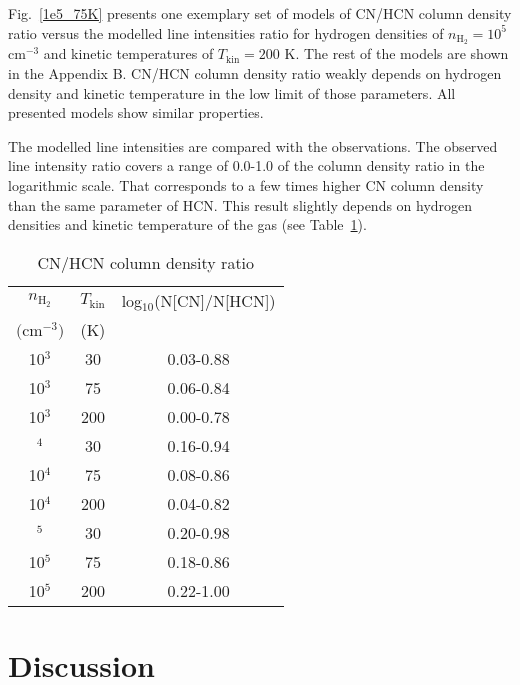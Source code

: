 \documentclass{aa}
\begin{document}
Fig.~\ref{1e5_75K} presents one exemplary set of models of CN/HCN column density ratio versus the modelled line intensities ratio for hydrogen densities of $n_\mathrm{H_2} = 10^5$ cm$^{-3}$ and kinetic temperatures of $T_\mathrm{kin} = 200$ K. The rest of the models are shown in the Appendix B. CN/HCN column density ratio weakly depends on hydrogen density and kinetic temperature in the low limit of those parameters. All presented models show similar properties.

The modelled line intensities are compared with the observations. The observed line intensity ratio covers a range of \mbox{0.0-1.0} of the column density ratio in the logarithmic scale. That corresponds to a few times higher CN column density than the same parameter of HCN. This result slightly depends on hydrogen densities and kinetic temperature of the gas (see Table~\ref{table:5}).

\begin{table}
\caption{CN/HCN column density ratio}             %
\label{table:5}      %
\centering                          %
\begin{tabular}{c c c} 
\hline\hline  
$n_\mathrm{H_2}$ & $T_\mathrm{kin}$ & log$_{10}$(N[CN]/N[HCN]) \\
$($cm$^{-3})$ & (K) & \\
\hline
10$^{3}$ & 30 & 0.03-0.88\\
10$^{3}$ & 75 & 0.06-0.84\\
10$^{3}$ & 200 & 0.00-0.78\\ \hdashline
10$^{4}$ & 30 & 0.16-0.94\\
10$^{4}$ & 75 & 0.08-0.86\\
10$^{4}$ & 200 & 0.04-0.82\\ \hdashline
10$^{5}$ & 30 & 0.20-0.98\\
10$^{5}$ & 75 & 0.18-0.86\\
10$^{5}$ & 200 & 0.22-1.00\\ \hline
\end{tabular}
\end{table} 


\section{Discussion}
\end{document}
